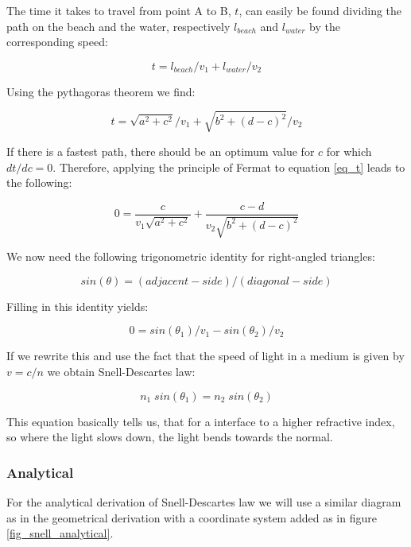 \documentclass{article}
\begin{document}
The time it takes to travel from point A to B, $t$, can easily be found dividing the path on the beach and the water, respectively $l_{beach}$ and $l_{water}$ by the corresponding speed:

\begin{equation*}
	t = l_{beach}/v_1 + l_{water}/v_2
\end{equation*}

Using the pythagoras theorem we find:

\begin{equation}
	t = \sqrt{a^2 + c^2}/v_1 + \sqrt{b^2 + (d-c)^2}/v_2
	\label{eq_t}
\end{equation}

If there is a fastest path, there should be an optimum value for $c$ for which $dt/dc = 0$. Therefore, applying the principle of Fermat to equation \ref{eq_t} leads to the following:

\begin{equation*}
	0 = \frac{c}{v_1 \sqrt{a^2 + c^2}} + \frac{c-d}{v_2 \sqrt{b^2 + (d-c)^2}}
\end{equation*}

We now need the following trigonometric identity for right-angled triangles:
 
\begin{equation}
	sin(\theta) = (adjacent-side)/(diagonal-side) 
	\label{eq_sin_identity}
\end{equation}

Filling in this identity yields:

\begin{equation*}
	0 =  sin(\theta _1)/v_1 - sin(\theta _2)/v_2
\end{equation*}

If we rewrite this and use the fact that the speed of light in a medium is given by $v = c/n$ we obtain Snell-Descartes law:

\begin{equation*}
	n_1 \; sin(\theta _1) = n_2 \; sin(\theta _2)
\end{equation*}

This equation basically tells us, that for a interface to a higher refractive index, so where the light slows down, the light bends towards the normal.

\subsubsection{Analytical}

For the analytical derivation of Snell-Descartes law we will use a similar diagram as in the geometrical derivation with a coordinate system added as in figure \ref{fig_snell_analytical}.
\end{document}
